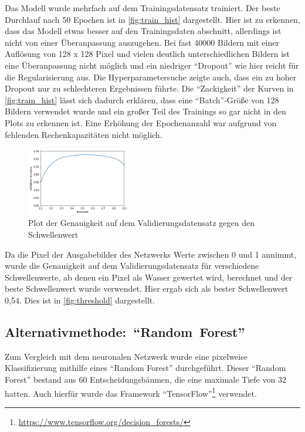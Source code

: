 Das Modell wurde mehrfach auf dem Trainingsdatensatz trainiert. 
Der beste Durchlauf nach 50 Epochen ist in \autoref{fig:train_hist} dargestellt.
Hier ist zu erkennen, dass das Modell etwas besser auf den Trainingsdaten abschnitt, allerdings ist nicht von einer Überanpassung auszugehen.
Bei fast 40000 Bildern mit einer Auflösung von 128 x 128 Pixel und vielen deutlich unterschiedlichen Bildern ist eine Überanpassung nicht möglich 
und ein niedriger \enquote{Dropout} wie hier reicht für die Regularisierung aus.
Die Hyperparametersuche zeigte auch, dass ein zu hoher Dropout nur zu schlechteren Ergebnissen führte.
Die \enquote{Zackigkeit} der Kurven in \autoref{fig:train_hist} lässt sich dadurch erklären, dass eine \enquote{Batch}-Größe von 128 Bildern verwendet wurde und ein großer Teil des Trainings so gar nicht in den Plots zu erkennen ist.
Eine Erhöhung der Epochenanzahl war aufgrund von fehlenden Rechenkapazitäten nicht möglich.

\begin{figure}
    \centering
    \includegraphics[width=0.4\textwidth]{images/threshold.png}
    \captionsetup{format=plain}
    \caption{Plot der Genauigkeit auf dem Validierungsdatensatz gegen den Schwellenwert}
    \vspace{-20pt}
    \label{fig:threshold}
\end{figure}

Da die Pixel der Ausgabebilder des Netzwerks Werte zwischen 0 und 1 annimmt, wurde die Genauigkeit auf dem Validierungsdatensatz
für verschiedene Schwellenwerte, ab denen ein Pixel als Wasser gewertet wird, berechnet und der beste Schwellenwert wurde verwendet.
Hier ergab sich als bester Schwellenwert 0,54.
Dies ist in \autoref{fig:threshold} dargestellt.
\FloatBarrier

\subsection{\mbox{Alternativmethode: \enquote{Random Forest}}}
\label{ssec:Alternativmethode}

Zum Vergleich mit dem neuronalen Netzwerk wurde eine pixelweise Klassifizierung mithilfe eines \enquote{Random Forest} durchgeführt.
Dieser \enquote{Random Forest} bestand aus 60 Entscheidungsbäumen, die eine maximale Tiefe von 32 hatten.
Auch hierfür wurde das Framework \enquote{TensorFlow}\footnote{\url{https://www.tensorflow.org/decision_forests/}} verwendet.\cite{tensorflow}

